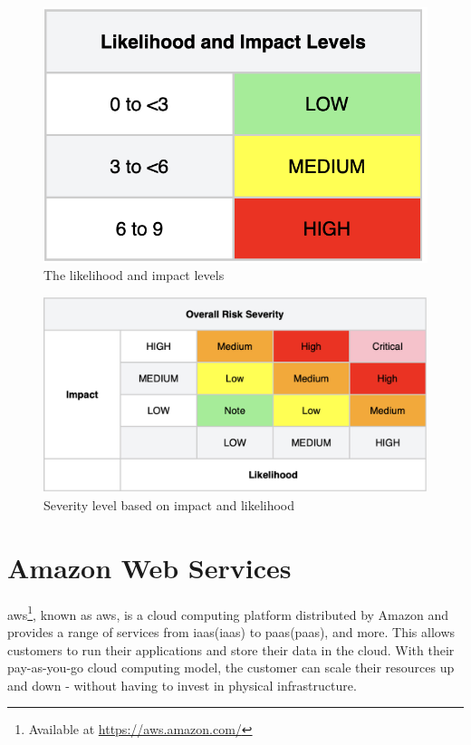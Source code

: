 \vspace{2mm}
\begin{figure}[H]
    \centering
    \includegraphics[scale=0.5]{Images/OWASP-likelihood.png}
    \caption{The likelihood and impact levels}
    \label{fig: Impact levels}
\end{figure}

\vspace{2mm}
\begin{figure}[H]
    \centering
    \includegraphics[scale=0.4]{Images/OWASP-severity.png}
    \caption{Severity level based on impact and likelihood}
    \label{fig: OWASP Severity Scale}
\end{figure}


\section{Amazon Web Services}
\acrlong{aws}\footnote{Available at \url{https://aws.amazon.com/}}, known as \acrshort{aws}, is a cloud computing platform distributed by Amazon and provides a range of services from \acrlong{iaas}(\acrshort{iaas}) to \acrlong{paas}(\acrshort{paas}), and more. This allows customers to run their applications and store their data in the cloud. With their pay-as-you-go cloud computing model, the customer can scale their resources up and down - without having to invest in physical infrastructure.\cite{aws}  

